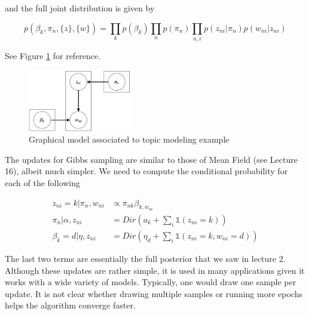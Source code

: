 \documentclass{article}
\begin{document}
and the full joint distribution is given by 

\begin{equation*}
p(\beta_k, \pi_n, \{z\}, \{w\}) = \prod_{k}{p(\beta_k)}\prod_{n}{p(\pi_n)}\prod_{n,i}{p(z_{ni} | \pi_n){p(w_{ni} | z_{ni})}}
\end{equation*}

See Figure \ref{fig:topic_modeling} for reference. 

\begin{figure}[!ht]
\centering
\includegraphics[width = 0.4\textwidth]{topic_model.pdf}
\caption{Graphical model associated to topic modeling example}
\label{fig:topic_modeling}
\end{figure}


The updates for Gibbs sampling are similar to those of Mean Field (see Lecture 16), albeit much simpler. We need to compute the conditional probability for each of the following

\begin{align*}
z_{ni} = k | \pi_n, w_{ni} &\propto \pi_{nk}\beta_{k,w_{ni}} \\
\pi_n | \alpha, z_{ni} &= Dir(a_k + \sum_{i}\mathbb{1}(z_{ni} = k)) \\
\beta_k = d | \eta, z_{ni} &= Dir(\eta_d + \sum_{i}\mathbb{1}(z_{ni} = k, w_{ni} = d))
\end{align*}

The last two terms are essentially the full posterior that we saw in lecture 2. Although these updates are rather simple, it is used in many applications given it works with a wide variety of models. Typically, one would draw one sample per update. It is not clear whether drawing multiple samples or running more epochs helps the algorithm converge faster. 
\end{document}
